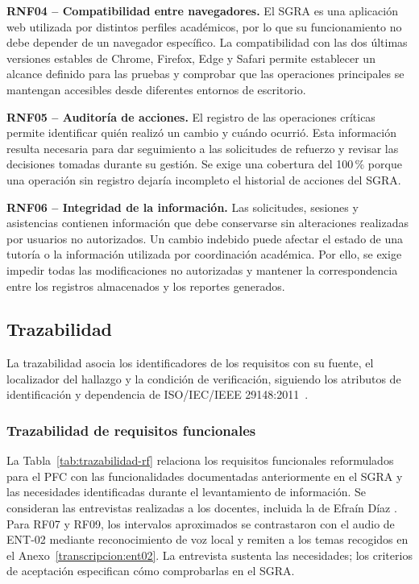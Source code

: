 \par\medskip
\noindent\textbf{RNF04 -- Compatibilidad entre navegadores.}
El SGRA es una aplicación web utilizada por distintos perfiles
académicos, por lo que su funcionamiento no debe depender de
un navegador específico. La compatibilidad con las dos últimas
versiones estables de Chrome, Firefox, Edge y Safari permite
establecer un alcance definido para las pruebas y comprobar
que las operaciones principales se mantengan accesibles desde
diferentes entornos de escritorio.

\par\medskip
\noindent\textbf{RNF05 -- Auditoría de acciones.}
El registro de las operaciones críticas permite identificar quién
realizó un cambio y cuándo ocurrió. Esta información resulta
necesaria para dar seguimiento a las solicitudes de refuerzo y
revisar las decisiones tomadas durante su gestión. Se exige una
cobertura del 100\,\% porque una operación sin registro dejaría
incompleto el historial de acciones del SGRA.

\par\medskip
\noindent\textbf{RNF06 -- Integridad de la información.}
Las solicitudes, sesiones y asistencias contienen información
que debe conservarse sin alteraciones realizadas por usuarios
no autorizados. Un cambio indebido puede afectar el estado
de una tutoría o la información utilizada por coordinación
académica. Por ello, se exige impedir todas las modificaciones
no autorizadas y mantener la correspondencia entre los
registros almacenados y los reportes generados.



\subsection{Trazabilidad}
La trazabilidad asocia los identificadores de los requisitos con
su fuente, el localizador del hallazgo y la condición de verificación,
siguiendo los atributos de identificación y dependencia de
ISO/IEC/IEEE 29148:2011~\cite{iso29148-2011}.

\subsubsection{Trazabilidad de requisitos funcionales}
La Tabla~\ref{tab:trazabilidad-rf} relaciona los requisitos
funcionales reformulados para el PFC con las funcionalidades
documentadas anteriormente en el SGRA y las necesidades
identificadas durante el levantamiento de información.
Se consideran las entrevistas realizadas a los docentes,
incluida la de Efraín Díaz \cite{Daz2025}. Para RF07 y RF09,
los intervalos aproximados se contrastaron con el audio de
ENT-02 mediante reconocimiento de voz local y remiten a los
temas recogidos en el Anexo~\ref{transcripcion:ent02}.
La entrevista sustenta las necesidades; los criterios de
aceptación especifican cómo comprobarlas en el SGRA.

